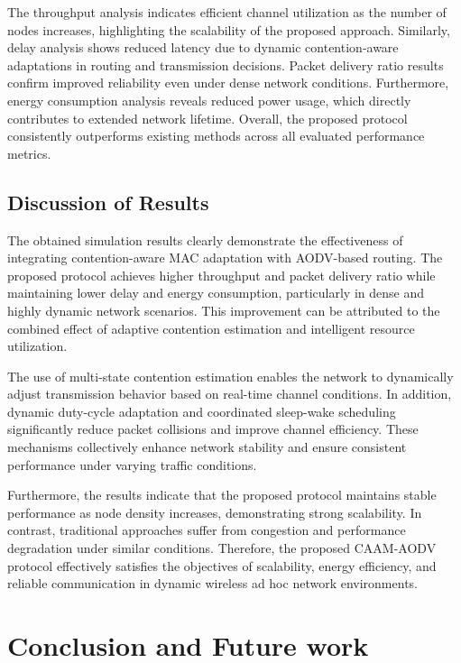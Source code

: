 \documentclass[a4paper,fleqn,final,1p]{cas-dc}
\numberwithin{equation}{section}
\begin{document}
The throughput analysis indicates efficient channel utilization as the number of nodes increases, highlighting the scalability of the proposed approach. Similarly, delay analysis shows reduced latency due to dynamic contention-aware adaptations in routing and transmission decisions. Packet delivery ratio results confirm improved reliability even under dense network conditions. Furthermore, energy consumption analysis reveals reduced power usage, which directly contributes to extended network lifetime. Overall, the proposed protocol consistently outperforms existing methods across all evaluated performance metrics.

\subsection{Discussion of Results}

The obtained simulation results clearly demonstrate the effectiveness of integrating contention-aware MAC adaptation with AODV-based routing. The proposed protocol achieves higher throughput and packet delivery ratio while maintaining lower delay and energy consumption, particularly in dense and highly dynamic network scenarios. This improvement can be attributed to the combined effect of adaptive contention estimation and intelligent resource utilization.

The use of multi-state contention estimation enables the network to dynamically adjust transmission behavior based on real-time channel conditions. In addition, dynamic duty-cycle adaptation and coordinated sleep-wake scheduling significantly reduce packet collisions and improve channel efficiency. These mechanisms collectively enhance network stability and ensure consistent performance under varying traffic conditions.

Furthermore, the results indicate that the proposed protocol maintains stable performance as node density increases, demonstrating strong scalability. In contrast, traditional approaches suffer from congestion and performance degradation under similar conditions. Therefore, the proposed CAAM-AODV protocol effectively satisfies the objectives of scalability, energy efficiency, and reliable communication in dynamic wireless ad hoc network environments.

\section{Conclusion and Future work}
\end{document}
